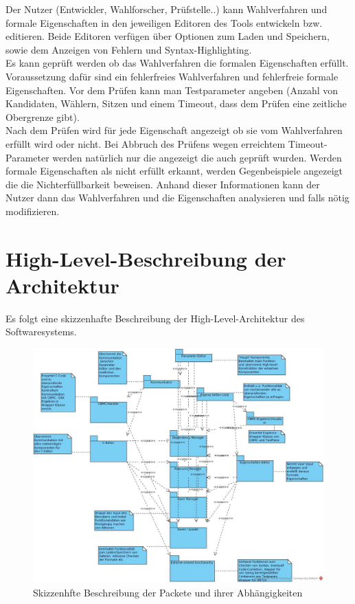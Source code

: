 \documentclass[a4paper]{scrreprt}
\begin{document}
Der Nutzer (Entwickler, Wahlforscher, Prüfstelle..) kann Wahlverfahren und formale Eigenschaften in den jeweiligen Editoren des Tools entwickeln bzw. editieren.
Beide Editoren verfügen über Optionen zum Laden und Speichern, sowie dem Anzeigen von Fehlern und Syntax-Highlighting.\\
Es kann geprüft werden ob das Wahlverfahren die formalen Eigenschaften erfüllt. Voraussetzung dafür sind ein fehlerfreies Wahlverfahren und fehlerfreie formale Eigenschaften. Vor dem Prüfen kann man Testparameter angeben (Anzahl von Kandidaten, Wählern, Sitzen und einem Timeout, dass dem Prüfen eine zeitliche Obergrenze gibt).\\
Nach dem Prüfen wird für jede Eigenschaft angezeigt ob sie vom Wahlverfahren erfüllt wird oder nicht. Bei Abbruch des Prüfens wegen erreichtem Timeout-Parameter werden natürlich nur die angezeigt die auch geprüft wurden. Werden formale Eigenschaften als nicht erfüllt erkannt, werden Gegenbeispiele angezeigt die die Nichterfüllbarkeit beweisen. Anhand dieser Informationen kann der Nutzer dann das Wahlverfahren und die Eigenschaften analysieren und falls nötig modifizieren.

\section{High-Level-Beschreibung der Architektur}	
Es folgt eine skizzenhafte Beschreibung der High-Level-Architektur des Softwaresystems. 

\begin{figure}[H]
\includegraphics[scale=0.4]{architecture_first_scetch.jpg}
\caption{Skizzenhfte Beschreibung der Packete und ihrer Abhängigkeiten}
\label{Packet-scetch}
\end{figure}
\end{document}
